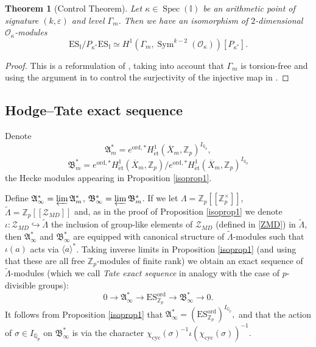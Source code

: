 \documentclass[a4paper,11pt]{amsart}
\numberwithin{equation}{section}
\theoremstyle{plain}
\newtheorem{theorem}{Theorem}[section]
\theoremstyle{definition}
\theoremstyle{remark}
\newcommand{\Q}{\mathbb{Q}}
\newcommand{\Z}{\mathbb{Z}}
\newcommand{\I}{\mathbb{I}}
\DeclareMathOperator{\Spec}{Spec}
\DeclareMathOperator{\Sym}{Sym}
\newcommand{\cyc}{{\mathrm{cyc}}}
\newcommand{\ord}{\mathrm{ord}}
\newcommand{\ES}{\mathrm{ES}}
\newcommand{\et}{\mathrm{\acute{e}t}}
\newcommand{\invlim}{\mathop{\varprojlim}\limits}
\begin{document}
\begin{theorem}[Control Theorem]\label{CT}
    Let $\kappa\in \Spec(\I)$ be an arithmetic point of signature $(k,\varepsilon)$ and level $\Gamma_m$. Then we have an isomorphism of $2$-dimensional $\mathcal{O}_\kappa$-modules 
    \[\ES_\I/P_{\kappa^*}\ES_\I\simeq H^1(\Gamma_m,\Sym^{k-2}(\mathcal{O}_\kappa))[P_{{\kappa^*}}].\]
\end{theorem}
\begin{proof}
    This is a reformulation of \cite[Theorem 2.19]{LV-IJNT}, taking into account that $\Gamma_m$ is torsion-free and using the 
    argument in \cite[Supplement 5.3]{AS} to control the surjectivity of the injective map in \cite[Lemma 2.15]{LV-IJNT}. 
\end{proof}

\subsection{Hodge--Tate exact sequence} \label{HT}
Denote 
\[\mathfrak{A}_m^*=e^{\ord,*}H^1_{\et}(\overline{X}_m,\Z_p)^{I_{\Q_p}},\]
\begin{equation}\label{def:Bm*}
\mathfrak{B}_m^*=e^{\ord,*}H^1_{\et}(\overline{X}_m,\Z_p)/e^{\ord,*}H^1_{\et}(\overline{X}_m,\Z_p)^{I_{\Q_p}}\end{equation}
the Hecke modules appearing in Proposition \ref{isoprop1}. 

Define 
$\mathfrak{A}_\infty^*=\invlim\mathfrak{A}_m^*$, 
$\mathfrak{B}_\infty^*=\invlim\mathfrak{B}_m^*$. 
If we let $\Lambda=\Z_p[[\Z_p^\times]]$, $\widetilde{\Lambda}=\Z_p[[\mathcal{Z}_{MD}]]$ and, as in the proof of Proposition \ref{isoprop1} we denote $\iota\colon \mathcal{Z}_{MD}\hookrightarrow \widetilde{\Lambda}$ the inclusion of group-like elements of $\mathcal{Z}_{MD}$ (defined in \eqref{ZMD}) in $\widetilde{\Lambda}$, then $\mathfrak{A}_\infty^*$ and $\mathfrak{B}_\infty^*$ are equipped with canonical structure of $\widetilde\Lambda$-modules such that 
$\iota(a)$ acts via $\langle a\rangle^*$.  
Taking inverse limits in Proposition \ref{isoprop1} (and using that these are all free $\Z_p$-modules of finite rank) we obtain an exact sequence of $\widetilde\Lambda$-modules (which we call \emph{Tate exact sequence} in analogy with the case of $p$-divisible groups): 
\[0\longrightarrow \mathfrak{A}_\infty^*\longrightarrow  \ES_{\Z_p}^\ord\longrightarrow \mathfrak{B}_\infty^*\longrightarrow 0.\] It follows from Proposition \ref{isoprop1} that 
$\mathfrak{A}_\infty^* = (\ES_{\Z_p}^\ord)^{I_{\Q_p}},$ 
and that the action of $\sigma\in I_{\Q_p}$ on $\mathfrak{B}_\infty^*$ is via the character $\chi_\cyc(\sigma)^{-1}\iota(\chi_\cyc(\sigma))^{-1}.$
\end{document}
